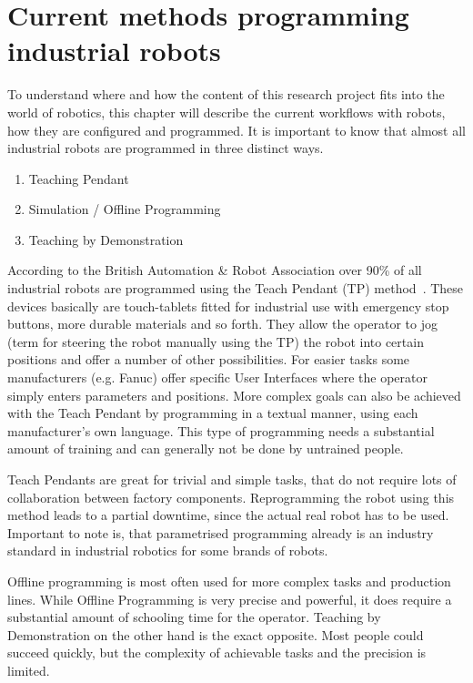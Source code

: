 \section{Current methods programming industrial robots}
To understand where and how the content of this research project fits into the world of robotics, this chapter will describe the current workflows with robots, how they are configured and programmed. It is important to know that almost all industrial robots are programmed in three distinct ways.
\begin{enumerate}
	\setcounter{enumi}{0}
	\setlength\itemsep{-1em}
	\item Teaching Pendant
	\item Simulation / Offline Programming
	\item Teaching by Demonstration
\end{enumerate}

According to the British Automation \& Robot Association over 90\% of all industrial robots are programmed using the Teach Pendant (TP) method~\cite{bara}. These devices basically are touch-tablets fitted for industrial use with emergency stop buttons, more durable materials and so forth. They allow the operator to jog (term for steering the robot manually using the TP) the robot into certain positions and offer a number of other possibilities. For easier tasks some manufacturers (e.g. Fanuc) offer specific User Interfaces where the operator simply enters parameters and positions. More complex goals can also be achieved with the Teach Pendant by programming in a textual manner, using each manufacturer's own language. This type of programming needs a substantial amount of training and can generally not be done by untrained people. 

Teach Pendants are great for trivial and simple tasks, that do not require lots of collaboration between factory components. Reprogramming the robot using this method leads to a partial downtime, since the actual real robot has to be used. Important to note is, that parametrised programming already is an industry standard in industrial robotics for some brands of robots. 

Offline programming is most often used for more complex tasks and production lines. While Offline Programming is very precise and powerful, it does require a substantial amount of schooling time for the operator. Teaching by Demonstration on the other hand is the exact opposite. Most people could succeed quickly, but the complexity of achievable tasks and the precision is limited.

